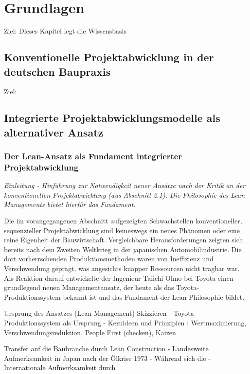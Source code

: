 \chapter{Grundlagen}
\label{ch:grundlagen}
Ziel: Dieses Kapitel legt die Wissensbasis

\section{Konventionelle Projektabwicklung in der deutschen Baupraxis}
\label{sec: 2.1}
Ziel:

\clearpage

\section{Integrierte Projektabwicklungsmodelle als alternativer Ansatz}
\label{sec: 2.2}

\subsection{Der Lean-Ansatz als Fundament integrierter Projektabwicklung}
\label{sec:2.2.1}

\textit{Einleitung - Hinführung zur Notwendigkeit neuer Ansätze nach der Kritik an der konventionellen Projektabwicklung (aus Abschnitt 2.1). Die Philosophie des Lean Managements bietet hierfür das Fundament.}

Die im vorangegangenen Abschnitt aufgezeigten Schwachstellen konventioneller, sequenzieller Projektabwicklung sind keineswegs ein neues Phänomen oder eine reine Eigenheit der Bauwirtschaft. Vergleichbare Herausforderungen zeigten sich bereits nach dem Zweiten Weltkrieg in der japanischen Automobilindustrie. Die dort vorherrschenden Produktionsmethoden waren von Ineffizienz und Verschwendung geprägt, was angesichts knapper Ressourcen nicht tragbar war. Als Reaktion darauf entwickelte der Ingenieur Taiichi Ohno bei Toyota einen grundlegend neuen Managementansatz, der heute als das Toyota-Produktionssystem bekannt ist und das Fundament der Lean-Philosophie bildet.

Ursprung des Ansatzes (Lean Management) Skizzieren
- Toyota-Produktionssystem\autocite[]{ohno_toyota-produktionssystem_2013} als Ursprung
- Kernideen und Prinzipien : Wertmaximierung, Verschwendungsreduktion, People First (checken), Kaizen

Transfer auf die Baubranche durch Lean Construction
- Landesweite Aufmerksamkeit in Japan nach der Ölkrise 1973
- Während sich die 
- Internationale Aufmerksamkeit durch 

